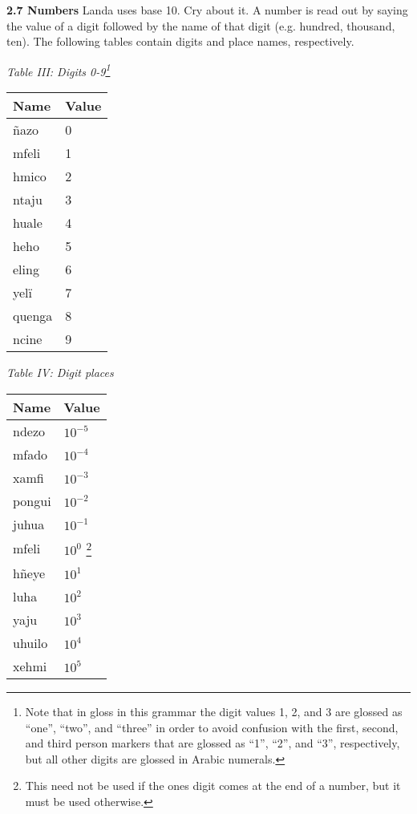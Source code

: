 \documentclass{article}[10pt]
\begin{document}
{\bf 2.7 Numbers}
Landa uses base 10. Cry about it. A number is read out by saying the value of a digit followed by the name of that digit (e.g. hundred, thousand, ten). The following tables contain digits and place names, respectively.
\begin{center}
\emph{Table III: Digits 0-9\emph{\footnote{Note that in gloss in this grammar the digit values 1, 2, and 3 are glossed as ``one'', ``two'', and ``three'' in order to avoid confusion with the first, second, and third person markers that are glossed as ``1'', ``2'', and ``3'', respectively, but all other digits are glossed in Arabic numerals.}}}\\
\begin{tabularx}{0.5\textwidth}{ |X|X| }
\hline
{\bf Name} & \bf{Value} \\ \hline
 \~{n}azo & 0 \\ \hline
 mfeli & 1 \\ \hline
 hmico & 2 \\ \hline
 ntaju & 3 \\ \hline
 huale & 4 \\ \hline
 heho & 5 \\ \hline
 eling & 6 \\ \hline
 yel\"{i} & 7 \\ \hline
 quenga & 8 \\ \hline
 ncine & 9 \\ \hline
\end{tabularx}
\end{center}

\begin{center}
\emph{Table IV: Digit places}\\
\begin{tabularx}{0.5\textwidth}{ |X|X| }
\hline
{\bf Name} & \bf{Value} \\ \hline
 ndezo & $10^{-5}$ \\ \hline
 mfado & $10^{-4}$ \\ \hline
 xamfi & $10^{-3}$ \\ \hline
 pongui & $10^{-2}$ \\ \hline
 juhua & $10^{-1}$ \\ \hline
 mfeli & $10^{0}$ \footnote{This need not be used if the ones digit comes at the end of a number, but it must be used otherwise.} \\ \hline
 h\~{n}eye & $10^1$ \\ \hline
 luha & $10^2$ \\ \hline
 yaju & $10^3$ \\ \hline
 uhuilo & $10^4$ \\ \hline
 xehmi & $10^5$ \\ \hline
\end{tabularx}
\end{center}
\end{document}
